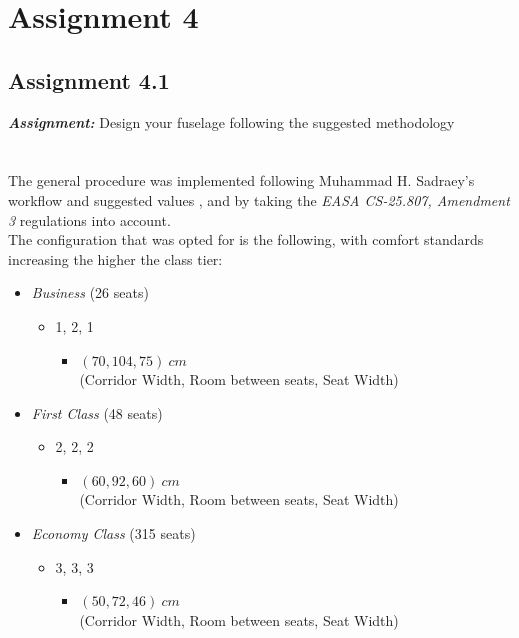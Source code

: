\documentclass{article}
\begin{document}
\clearpage

\section{Assignment 4\label{Assignment_4}}

\subsection{Assignment 4.1\label{Assignment_4.1}}

\textbf{\textit{Assignment:}} Design your fuselage following the suggested methodology\\ \\ \\ 

The general procedure was implemented following Muhammad H. Sadraey's workflow and suggested values \autocite{Sadraey_Mohammad},
and by taking the \textit{EASA CS-25.807, Amendment 3} \autocite{EASA_CS25} regulations into account.\\ 

The configuration that was opted for is the following, with comfort standards increasing the higher the class tier: 
\begin{itemize}
    \item \textit{Business} (26 seats)
        \begin{itemize}
            \item 1, 2, 1
            \begin{itemize}
                \item $\left ( 70, 104, 75 \right ) \ cm$ \\ (Corridor Width, Room between seats, Seat Width)
            \end{itemize}
        \end{itemize}
    \item \textit{First Class} (48 seats)
        \begin{itemize}
            \item 2, 2, 2
            \begin{itemize}
                \item $\left ( 60, 92, 60 \right ) \ cm$ \\ (Corridor Width, Room between seats, Seat Width)
            \end{itemize}
        \end{itemize}
    \item \textit{Economy Class} (315 seats)
        \begin{itemize}
            \item 3, 3, 3
            \begin{itemize}
                \item $\left ( 50, 72, 46 \right ) \ cm$ \\ (Corridor Width, Room between seats, Seat Width)
            \end{itemize}
        \end{itemize}
\end{itemize}
\clearpage
\end{document}
